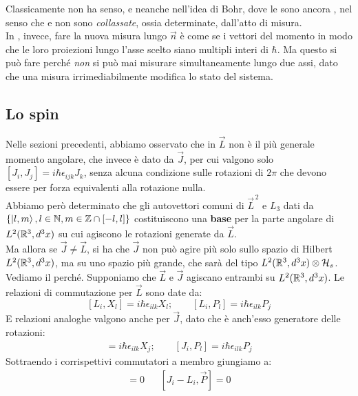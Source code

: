 \documentclass[../../FisicaTeorica.tex]{subfiles}
\begin{document}
\begin{itemize}
Classicamente non ha senso, e neanche nell'idea di Bohr, dove le  sono ancora , nel senso che  e non sono \textit{collassate}, ossia determinate, dall'atto di misura.\\
In \MQ, invece, fare la nuova misura lungo $\vec{n}$ è come se  i vettori del momento in modo che le loro proiezioni lungo l'asse scelto siano multipli interi di $\hbar$. Ma questo si può fare perché \textit{non} si può mai misurare simultaneamente lungo due assi, dato che una misura irrimediabilmente modifica lo stato del sistema.
\end{itemize}

\subsection{Lo spin}%
Nelle sezioni precedenti, abbiamo osservato che in \MQ $\vec{L}$ non è il più generale momento angolare, che invece è dato da $\vec{J}$, per cui valgono solo $[J_i, J_j]=i\hbar \epsilon_{ijk}J_k$, senza alcuna condizione sulle rotazioni di $2\pi$ che devono essere per forza equivalenti alla rotazione nulla.\\
Abbiamo però determinato che gli autovettori comuni di $\vec{L}^{\,2}$ e $L_3$ dati da $\{\Ket{l,m}, l\in \mathbb{N}, m \in \mathbb{Z}\cap [-l,l]\}$ costituiscono una \textbf{base} per la parte angolare di $L^2(\mathbb{R}^3, d^3x)$ su cui agiscono le rotazioni generate da $\vec{L}$.\\
Ma allora se $\vec{J}\neq \vec{L}$, si ha che $\vec{J}$ non può agire più solo sullo spazio di Hilbert $L^2(\mathbb{R}^3, d^3x)$, ma su uno spazio più grande, che sarà del tipo $L^2(\mathbb{R}^3, d^3x)\otimes \mathcal{H}_s$.\\
Vediamo il perché. Supponiamo che $\vec{L}$ e $\vec{J}$ agiscano entrambi su $L^2(\mathbb{R}^3, d^3x)$. Le relazioni di commutazione per $\vec{L}$ sono date da:
\[
[L_i, X_l] = i\hbar \epsilon_{ilk} X_l; \qquad [L_i, P_l]=i\hbar \epsilon_{ilk} P_j
\]
E relazioni analoghe valgono anche per $\vec{J}$, dato che è anch'esso generatore delle rotazioni:
\begin{align*}
[J_i,X_l]=i\hbar \epsilon_{ilk} X_j; \qquad [J_i, P_l]=i\hbar \epsilon_{ilk} P_j
\end{align*}
Sottraendo i corrispettivi commutatori a membro giungiamo a:
\begin{align*}
[J_i-L_i, \vec{X}]=0 && [J_i-L_i, \vec{P}]=0
\end{align*}
\end{document}
